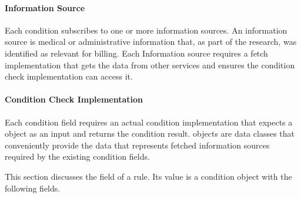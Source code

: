 \paragraph{Information Source}
Each condition subscribes to one or more information sources.
An information source is medical or administrative information that, as part of the research, was identified as relevant for billing.
Each Information source requires a fetch implementation that gets the data from other \AV services and ensures the condition check implementation can access it.

\paragraph{Condition Check Implementation}
Each condition field requires an actual condition implementation that expects a  object as an input and returns the condition result.
 objects are data classes that conveniently provide the data that represents fetched information sources required by the existing condition fields.

%
This section discusses the  field of a rule.
Its value is a condition object with the following fields.

